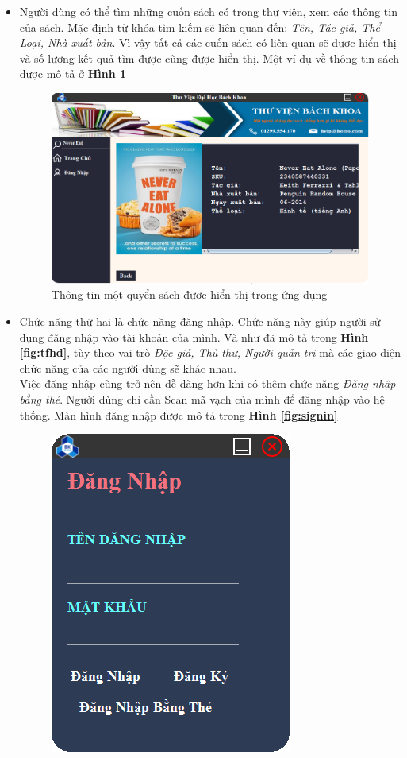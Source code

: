 \documentclass[12pt]{report}
\begin{document}
					\begin{itemize}
						\item Người dùng có thể tìm những cuốn sách có trong thư viện, xem các thông tin của sách. Mặc định từ khóa tìm kiếm sẽ liên quan đến: \textit{Tên, Tác giả, Thể Loại, Nhà xuất bản}. Vì vậy tất cả các cuốn sách có liên quan sẽ được hiển thị và số lượng kết quả tìm được cũng được hiển thị. 
						Một ví dụ về thông tin sách được mô tả ở \textbf{Hình \ref{fig:example}}
						\begin{figure}
						\centering
						\includegraphics[scale=0.65]{images/example.png}
						\caption{Thông tin một quyển sách đươc hiển thị trong ứng dụng}
						\label{fig:example}
						\end{figure}
						\item Chức năng thứ hai là chức năng đăng nhập. Chức năng này giúp người sử dụng đăng nhập vào tài khoản của mình. Và như đã mô tả trong \textbf{Hình \ref{fig:tfhd}}, tùy theo vai trò \textit{Độc giả, Thủ thư, Người quản trị} mà các giao diện chức năng của các người dùng sẽ khác nhau.\\
						Việc đăng nhập cũng trở nên dễ dàng hơn khi có thêm chức năng \textit{Đăng nhập bằng thẻ}. Người dùng chỉ cần Scan mã vạch của mình để đăng nhập vào hệ thống. Màn hình đăng nhập được mô tả trong \textbf{Hình \ref{fig:signin}}\\
						\begin{figure}
						\centering
						\includegraphics[scale=0.75]{images/signin.png}

\end{figure}
\end{itemize}
\end{document}
